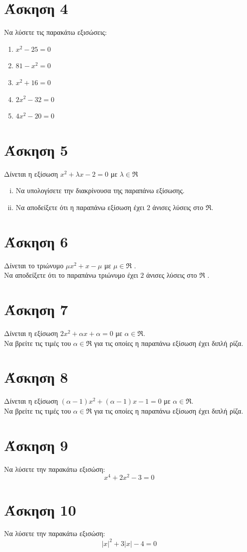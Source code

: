 \documentclass[a4paper,10pt]{report}
\begin{document}
\section*{Άσκηση 4  \hfill \small{}}
Να λύσετε τις παρακάτω εξισώσεις:
\begin{enumerate}[1)]
 \item $x^{2}-25=0$
 \item $81-x^{2}=0$
 \item $x^{2}+16=0$
 \item $2x^{2}-32=0$
 \item $4x^{2}-20=0$
\end{enumerate}



\section*{Άσκηση 5  \hfill \small{}}
Δίνεται η εξίσωση $x^{2}+λx-2=0$ με $λ\in \Re$
\begin{enumerate}[i)]
 \item Να υπολογίσετε την διακρίνουσα της παραπάνω εξίσωσης.
 \item Να αποδείξετε ότι η παραπάνω εξίσωση έχει $2$ άνισες λύσεις στο $\Re$.
\end{enumerate}

\section*{Άσκηση 6  \hfill \small{}}
Δίνεται το τριώνυμο $μx^{2}+x-μ$ με $μ\in \Re$ .\\
Να αποδείξετε ότι το παραπάνω τριώνυμο έχει $2$ άνισες λύσεις στο $\Re$ .

\section*{Άσκηση 7  \hfill \small{}}
Δίνεται η εξίσωση $2x^{2}+αx+α=0$ με $α\in \Re$.\\
Να βρείτε τις τιμές του $α\in \Re$ για τις οποίες η παραπάνω εξίσωση έχει διπλή ρίζα.


\section*{Άσκηση 8  \hfill \small{}}
Δίνεται η εξίσωση $(α-1)x^{2}+(α-1)x-1=0$ με $α\in \Re$.\\
Να βρείτε τις τιμές του $α\in \Re$ για τις οποίες η παραπάνω εξίσωση έχει διπλή ρίζα.

\section*{Άσκηση 9  \hfill \small{}}
Να λύσετε την παρακάτω εξισώση:
$$ x^{4}+2x^{2}-3=0$$

\section*{Άσκηση 10  \hfill \small{}}
Να λύσετε την παρακάτω εξισώση:
$$ |x|^{2}+3|x|-4=0$$
\end{document}
